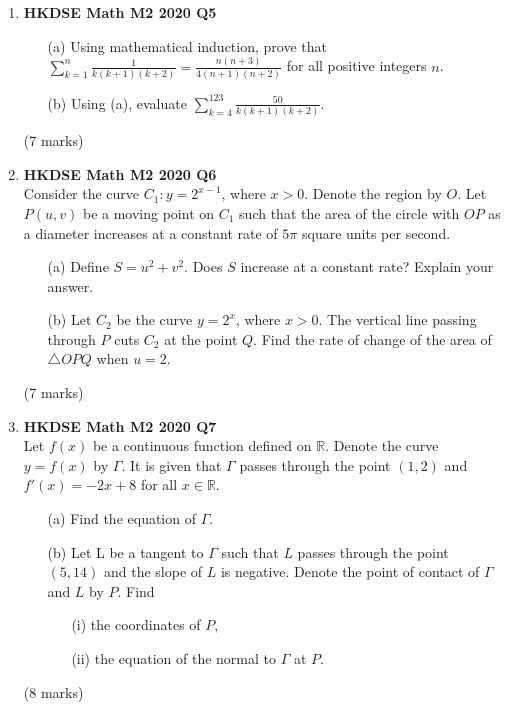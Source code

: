 \documentclass[12pt]{article}
\begin{document}
\begin{enumerate}
	\item \textbf{HKDSE Math M2 2020 Q5}
	\begin{enumerate}
		\item [(a)]Using mathematical induction, prove that $\displaystyle \sum_{k = 1}^{n} \frac{1}{k(k+1)(k+2)} = \frac{n(n+3)}{4(n+1)(n+2)}$ for all positive integers $n$.
		\item [(b)] Using (a), evaluate $\displaystyle \sum_{k = 4}^{123} \frac{50}{k(k+1)(k+2)}$.
	\end{enumerate}
	(7 marks)


	\item \textbf{HKDSE Math M2 2020 Q6}\\
	Consider the curve $C_1 : y = 2^{x-1}$, where $x>0$. Denote the region by $O$. Let $P(u,v)$ be a moving point on $C_1$ such that the area of the circle with $OP$ as a diameter increases at a constant rate of $5\pi$ square units per second.
	\begin{enumerate}
		\item[(a)]
		Define $S = u^2 + v^2$. Does $S$ increase at a constant rate? Explain your answer. 
		\item[(b)]
		Let $C_2$ be the curve $y = 2^x$, where $x>0$. The vertical line passing through $P$ cuts $C_2$ at the point $Q$. Find the rate of change of the area of $\triangle OPQ$ when $u=2$.
	\end{enumerate}
	(7 marks)

	\item \textbf{HKDSE Math M2 2020 Q7}\\
	Let $f(x)$ be a continuous function defined on $\mathbb{R}$. Denote the curve $y = f(x)$ by $\Gamma$. It is given that $\Gamma $ passes through the point $(1,2)$ and $f'(x) = -2x+8$ for all $x \in \mathbb{R}$. 
	\begin{enumerate}
		\item [(a)]Find the equation of $\Gamma$. 
		\item [(b)]Let L be a tangent to $\Gamma$ such that $L$ passes through the point $(5,14)$ and the slope of $L$ is negative. Denote the point of contact of $\Gamma$ and $L$ by $P$. Find 
		\begin{enumerate}
			\item [(i)]the coordinates of $P$, 
			\item [(ii)]the equation of the normal to $\Gamma $ at $P$.
		\end{enumerate}
	\end{enumerate}
	(8 marks)


\end{enumerate}
\end{document}
